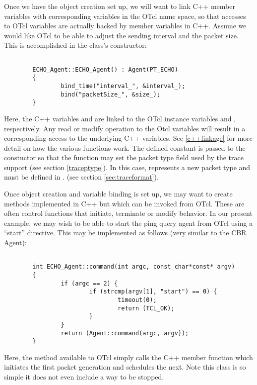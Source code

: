 Once we have the object creation set up, we will want to link
C++ member variables with corresponding variables in the OTcl
name space, so that accesses to OTcl variables are actually
backed by member variables in C++.
Assume we would like OTcl to be able to adjust the sending
interval and the packet size.
This is accomplished in the class's constructor:
\begin{small}
\begin{verbatim}

        ECHO_Agent::ECHO_Agent() : Agent(PT_ECHO)
        {
                bind_time("interval_", &interval_);
                bind("packetSize_", &size_);
        }
\end{verbatim}
\end{small}

Here, the C++ variables  and  are
linked to the OTcl instance variables  and
, respectively.
Any read or modify operation to the Otcl variables will result
in a corresponding access to the underlying C++ variables.
See \ref{c++linkage} for more detail on how the various 
functions work.
The defined constant  is passed to the 
constuctor so that the  function may set
the packet type field used by the trace support
(see section \ref{traceptype}).  In this case,  represents
a new packet type and must be defined in .
(see section \ref{sec:traceformat}).

Once object creation and variable binding is set up, we may
want to create methods implemented in C++ but which can
be invoked from OTcl.
These are often control functions that initiate, terminate or
modify behavior.
In our present example, we may wish to be able to start the
ping query agent from OTcl using a ``start'' directive.
This may be implemented as follows (very similar to the CBR Agent):
\begin{small}
\begin{verbatim}

        int ECHO_Agent::command(int argc, const char*const* argv)
        {
                if (argc == 2) {
                        if (strcmp(argv[1], "start") == 0) {
                                timeout(0);
                                return (TCL_OK);
                        }
                }
                return (Agent::command(argc, argv));
        }
\end{verbatim}
\end{small}
Here, the  method available to OTcl simply calls
the C++ member function  which initiates the
first packet generation and schedules the next.
Note this class is so simple it does not even include a
way to be stopped.

